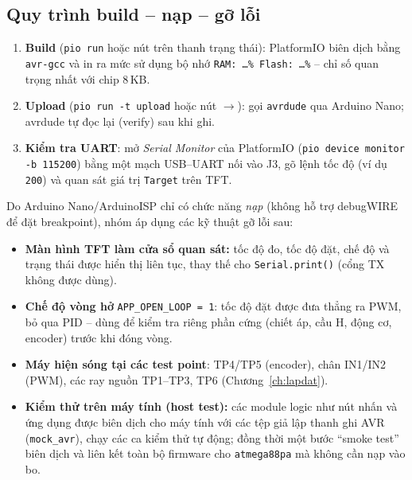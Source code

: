 \subsection{Quy trình build -- nạp -- gỡ lỗi}
\begin{enumerate}
  \item \textbf{Build} (\texttt{pio run} hoặc nút \checkmark{} trên thanh trạng thái): PlatformIO biên dịch bằng \texttt{avr-gcc} và in ra mức sử dụng bộ nhớ \texttt{RAM: \ldots\% Flash: \ldots\%} -- chỉ số quan trọng nhất với chip 8\,KB. 
  \item \textbf{Upload} (\texttt{pio run -t upload} hoặc nút $\rightarrow$): gọi \texttt{avrdude} qua Arduino Nano; avrdude tự đọc lại (verify) sau khi ghi.
  \item \textbf{Kiểm tra UART}: mở \emph{Serial Monitor} của PlatformIO (\texttt{pio device monitor -b 115200}) bằng một mạch USB--UART nối vào J3, gõ lệnh tốc độ (ví dụ \texttt{200}) và quan sát giá trị \texttt{Target} trên TFT.
\end{enumerate}

Do Arduino Nano/ArduinoISP chỉ có chức năng \emph{nạp} (không hỗ trợ debugWIRE để đặt breakpoint), nhóm áp dụng các kỹ thuật gỡ lỗi sau:
\begin{itemize}
  \item \textbf{Màn hình TFT làm cửa sổ quan sát:} tốc độ đo, tốc độ đặt, chế độ và trạng thái được hiển thị liên tục, thay thế cho \texttt{Serial.print()} (cổng TX không được dùng).
  \item \textbf{Chế độ vòng hở} \texttt{APP\_OPEN\_LOOP = 1}: tốc độ đặt được đưa thẳng ra PWM, bỏ qua PID -- dùng để kiểm tra riêng phần cứng (chiết áp, cầu H, động cơ, encoder) trước khi đóng vòng.
  \item \textbf{Máy hiện sóng tại các test point}: TP4/TP5 (encoder), chân IN1/IN2 (PWM), các ray nguồn TP1--TP3, TP6 (Chương~\ref{ch:lapdat}).
  \item \textbf{Kiểm thử trên máy tính (host test):} các module logic như nút nhấn và ứng dụng được biên dịch cho máy tính với các tệp giả lập thanh ghi AVR (\texttt{mock\_avr}), chạy các ca kiểm thử tự động; đồng thời một bước ``smoke test'' biên dịch và liên kết toàn bộ firmware cho \texttt{atmega88pa} mà không cần nạp vào bo.
\end{itemize}
